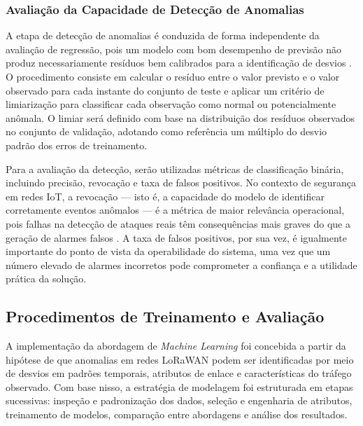 
\subsubsection{Avaliação da Capacidade de Detecção de Anomalias}

A etapa de detecção de anomalias é conduzida de forma independente da 
avaliação de regressão, pois um modelo com bom desempenho de previsão não 
produz necessariamente resíduos bem calibrados para a identificação de 
desvios \cite{chalapathy2019}. O procedimento consiste em calcular o resíduo 
entre o valor previsto e o valor observado para cada instante do conjunto de 
teste e aplicar um critério de limiarização para classificar cada observação 
como normal ou potencialmente anômala. O limiar será definido com base na 
distribuição dos resíduos observados no conjunto de validação, adotando como 
referência um múltiplo do desvio padrão dos erros de treinamento.

Para a avaliação da detecção, serão utilizadas métricas de classificação 
binária, incluindo precisão, revocação e taxa de falsos positivos. No 
contexto de segurança em redes IoT, a revocação — isto é, a capacidade do 
modelo de identificar corretamente eventos anômalos — é a métrica de maior 
relevância operacional, pois falhas na detecção de ataques reais têm 
consequências mais graves do que a geração de alarmes falsos \cite{hessel2023lorawan}. 
A taxa de falsos positivos, por sua vez, é igualmente importante do ponto de 
vista da operabilidade do sistema, uma vez que um número elevado de alarmes 
incorretos pode comprometer a confiança e a utilidade prática da solução.


\subsection{Procedimentos de Treinamento e Avaliação}
A implementação da abordagem de \textit{Machine Learning} foi concebida a partir da hipótese de que anomalias em redes LoRaWAN podem ser identificadas por meio de desvios em padrões temporais, atributos de enlace e características do tráfego observado. Com base nisso, a estratégia de modelagem foi estruturada em etapas sucessivas: inspeção e padronização dos dados, seleção e engenharia de atributos, treinamento de modelos, comparação entre abordagens e análise dos resultados.

